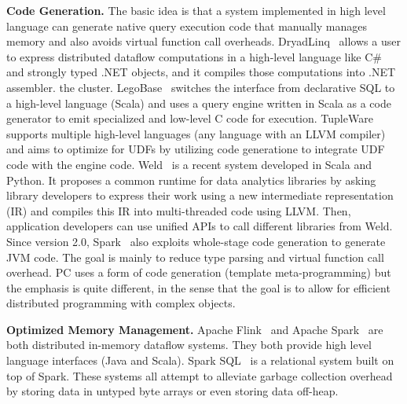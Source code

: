 \vspace{5pt}
\noindent
\textbf{Code Generation.} The basic idea is that a system implemented in high level language
can generate native query execution code that manually manages
memory and also avoids virtual function call
overheads. DryadLinq~\cite{yu2008dryadlinq} allows a user to express distributed dataflow
computations in a high-level language like C\# and strongly typed .NET
objects, and it compiles those computations into .NET assembler.
the cluster. 
LegoBase~\cite{klonatos2014building} switches the interface
from declarative SQL to a high-level language (Scala) and uses a query engine
written in Scala as a code generator to emit specialized and low-level
C code for execution. TupleWare~\cite{crotty2015tupleware} supports
multiple high-level languages (any language with an LLVM compiler) 
and aims to
optimize for UDFs by utilizing code
generatione to integrate UDF code with the engine 
code. 
Weld~\cite{palkar2017weld} is a recent system developed in Scala and
Python. It proposes
a common runtime for data analytics libraries by asking library
developers to express their work using a new intermediate
representation (IR) and compiles this IR into multi-threaded code using
LLVM.  Then, application developers can use unified APIs to
call different libraries from Weld. Since version 2.0, Spark~\cite{zaharia2012resilient}
also exploits whole-stage code generation to generate JVM 
code.  The goal is mainly to reduce type parsing and virtual function call
overhead. PC uses a form of code generation (template meta-programming) but 
the emphasis is quite different, in the sense that the goal is to allow for
efficient distributed programming with complex objects.

\vspace{5pt}
\noindent
\textbf{Optimized Memory Management.} 
Apache Flink~\cite{alexandrov2014stratosphere} and Apache
Spark~\cite{zaharia2012resilient} are both distributed in-memory
dataflow systems. They both provide high level language interfaces (Java and Scala).
Spark SQL~\cite{armbrust2015spark} is a relational system built on top
of Spark. These systems all attempt to 
alleviate garbage collection overhead by storing data
in untyped byte arrays or even storing data off-heap.

